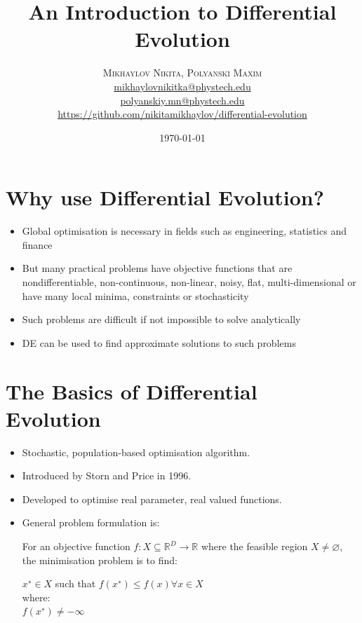 \documentclass[A4, twocolumn]{article}
\title{
\textbf{An Introduction to Differential Evolution} 
}
\date{\today}
\author{ 
	\textsc{Mikhaylov Nikita, Polyanski Maxim} \\
	\normalsize \href{mailto:mikhaylovnikitka@phystech.edu}{mikhaylovnikitka@phystech.edu} \\
	\normalsize \href{mailto:polyanskiy.mn@phystech.edu}{polyanskiy.mn@phystech.edu} \\
	\normalsize \href{https://github.com/nikitamikhaylov/differential-evolution}{https://github.com/nikitamikhaylov/differential-evolution}
}
\begin{document}
    \maketitle
    
	
  \section{\textbf{Why use Differential Evolution?}}	
	\begin{itemize}
		\item Global optimisation is necessary in fields such as engineering, statistics
		and finance
		
		\item But many practical problems have objective functions that are nondifferentiable,
		non-continuous, non-linear, noisy, flat, multi-dimensional
		or have many local minima, constraints or stochasticity
		
		\item Such problems are difficult if not impossible to solve analytically
		
		\item DE can be used to find approximate solutions to such problems
	\end{itemize}		
	
	
	\section{\textbf{The Basics of Differential Evolution}}
	
		\begin{itemize}
			\item Stochastic, population-based optimisation algorithm.
			\item Introduced by Storn and Price in 1996.
			\item Developed to optimise real parameter, real valued functions. 
			\item General problem formulation is: 
			
			 For an objective function $f : X \subseteq \mathds{R}^D \rightarrow  \mathds{R}$ where the feasible region $X \neq \varnothing$, the minimisation problem is to find:
			 
			 $x^{∗} \in X$ such that $f(x^{∗}) \leq f(x) \forall x ∈ X $  \\ where: \\ $f(x^{∗}) \neq − \infty $
		\end{itemize}
	
\end{document}

